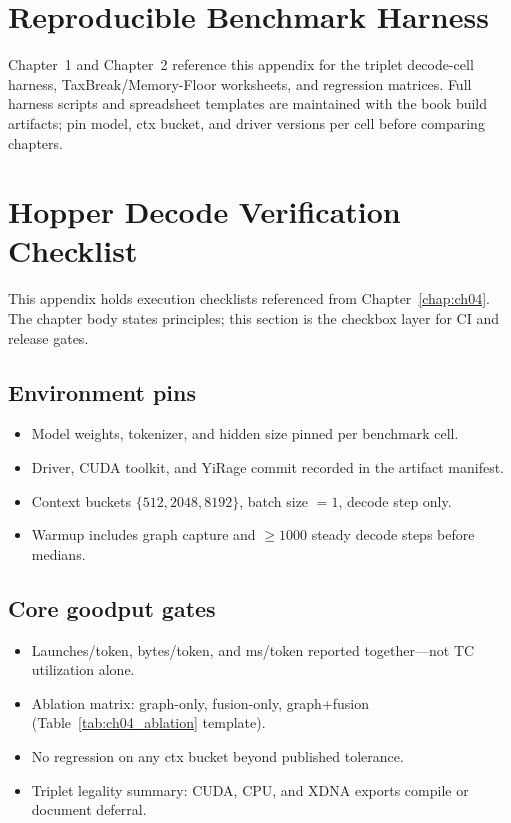 \appendix
\chapter{Reproducible Benchmark Harness}
\label{app:benchmark_harness}

Chapter~1 and Chapter~2 reference this appendix for the triplet decode-cell harness, TaxBreak/Memory-Floor worksheets, and regression matrices.
Full harness scripts and spreadsheet templates are maintained with the book build artifacts; pin model, ctx bucket, and driver versions per cell before comparing chapters.

\chapter{Hopper Decode Verification Checklist}
\label{app:hopper_checklist}

This appendix holds execution checklists referenced from Chapter~\ref{chap:ch04}.
The chapter body states principles; this section is the checkbox layer for CI and release gates.

\section{Environment pins}
\begin{itemize}
\item Model weights, tokenizer, and hidden size pinned per benchmark cell.
\item Driver, CUDA toolkit, and YiRage commit recorded in the artifact manifest.
\item Context buckets $\{512, 2048, 8192\}$, batch size $=1$, decode step only.
\item Warmup includes graph capture and ${\ge}1000$ steady decode steps before medians.
\end{itemize}

\section{Core goodput gates}
\begin{itemize}
\item Launches/token, bytes/token, and ms/token reported together---not TC utilization alone.
\item Ablation matrix: graph-only, fusion-only, graph+fusion (Table~\ref{tab:ch04_ablation} template).
\item No regression on any ctx bucket beyond published tolerance.
\item Triplet legality summary: CUDA, CPU, and XDNA exports compile or document deferral.
\end{itemize}

